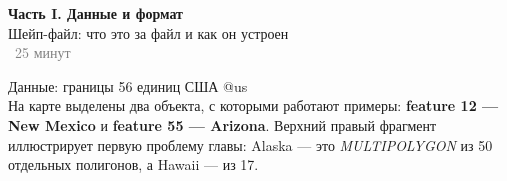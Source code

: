 \documentclass[aspectratio=169,10pt]{beamer}
\makeatletter
\newcommand{\usePic}[1]{\expandafter\csname pic@#1\endcsname}
\makeatother
\begin{document}
\begin{frame}
  \begin{center}
    {\LARGE\bfseries Часть I. Данные и формат}\\[0.5em]
    {\large Шейп-файл: что это за файл и как он устроен}\\[1.5em]
    {\small \textcolor{gray}{~25 минут}}
  \end{center}
\end{frame}

\begin{frame}{Данные: границы 56 единиц США}
\centering
\usePic{us}\\[0.1cm]
\footnotesize
На карте выделены два объекта, с которыми работают примеры:
\textcolor{codeblue}{\textbf{feature 12 --- New Mexico}} и
\textcolor{codeblue}{\textbf{feature 55 --- Arizona}}.
Верхний правый фрагмент иллюстрирует первую проблему главы:
\textcolor{numblue}{Alaska} --- это \emph{MULTIPOLYGON} из 50 отдельных
полигонов, а \textcolor{numblue}{Hawaii} --- из 17.
\end{frame}
\end{document}
